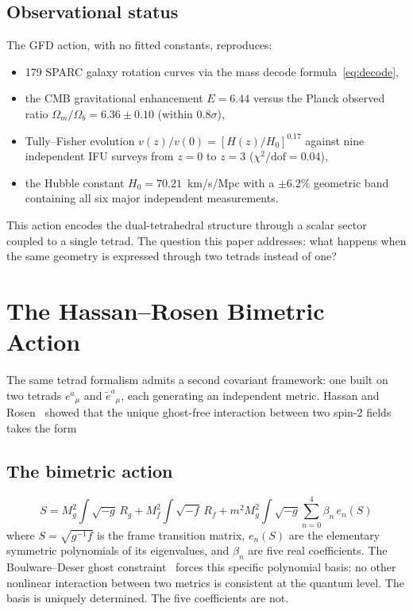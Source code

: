 \documentclass[twocolumn,showpacs,preprintnumbers,amsmath,amssymb,prd]{revtex4-2}
\begin{document}
\subsection{Observational status}

The GFD action, with no fitted constants, reproduces:
\begin{itemize}
\item 179 SPARC galaxy rotation curves via the mass decode formula~\eqref{eq:decode},
\item the CMB gravitational enhancement $E = 6.44$ versus the Planck observed ratio $\Omega_m/\Omega_b = 6.36 \pm 0.10$ (within $0.8\sigma$),
\item Tully--Fisher evolution $v(z)/v(0) = [H(z)/H_0]^{0.17}$ against nine independent IFU surveys from $z=0$ to $z=3$ ($\chi^2/\mathrm{dof} = 0.04$),
\item the Hubble constant $H_0 = 70.21$~km/s/Mpc with a $\pm 6.2\%$ geometric band containing all six major independent measurements.
\end{itemize}

This action encodes the dual-tetrahedral structure through a scalar sector coupled to a single tetrad. The question this paper addresses: what happens when the same geometry is expressed through two tetrads instead of one?


\section{The Hassan--Rosen Bimetric Action}
\label{sec:hr}

The same tetrad formalism admits a second covariant framework: one built on two tetrads $e^a{}_\mu$ and $\tilde{e}^a{}_\mu$, each generating an independent metric. Hassan and Rosen~\cite{HassanRosen2012a,HassanRosen2012b} showed that the unique ghost-free interaction between two spin-2 fields takes the form

\subsection{The bimetric action}

\begin{equation}
\label{eq:hr_action}
S = M_g^2\!\int\!\sqrt{-g}\,R_g + M_f^2\!\int\!\sqrt{-f}\,R_f + m^2 M_g^2\!\int\!\sqrt{-g}\sum_{n=0}^{4}\beta_n\, e_n(S)
\end{equation}
where $S = \sqrt{g^{-1}f}$ is the frame transition matrix, $e_n(S)$ are the elementary symmetric polynomials of its eigenvalues, and $\beta_n$ are five real coefficients. The Boulware--Deser ghost constraint~\cite{BoulwareDeser1972} forces this specific polynomial basis: no other nonlinear interaction between two metrics is consistent at the quantum level. The basis is uniquely determined. The five coefficients are not.
\end{document}
